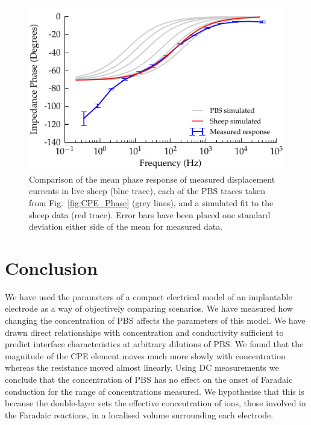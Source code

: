 \documentclass[journal, a4paper]{IEEEtran}
\begin{document}
\begin{figure}
    \begin{center}
        \includegraphics{graphics/displacement-withSheep_impedanceVsFrequency_phase}
    \end{center}
    \caption{{\color{blue} Comparison of the mean phase response of measured displacement currents in live sheep (blue trace), each of the PBS traces taken from Fig.~\ref{fig:CPE_Phase} (grey lines), and a simulated fit to the sheep data (red trace). Error bars have been placed one standard deviation either side of the mean for measured data.}}
    \label{fig:displacement_sheepCPEPhase}
\end{figure}





\section{Conclusion}
\label{sect:conclusion}
We have used the parameters of a compact electrical model of an implantable electrode as a way of objectively comparing scenarios.
We have measured how changing the concentration of PBS affects the parameters of this model.
We have drawn direct relationships with concentration {\color{blue} and conductivity} sufficient to predict interface characteristics at arbitrary dilutions of PBS.
We found that the magnitude of the CPE element moves much more slowly with concentration whereas the resistance moved almost linearly.
Using DC measurements we conclude that the {\color{blue} concentration of PBS has no effect on the onset of Faradaic conduction for the range of concentrations {\color{blue} measured}.} We hypothesise that this is because the double-layer sets the effective concentration of ions{\color{blue}, those involved in the Faradaic reactions,} in a localised volume surrounding each electrode.
\end{document}
